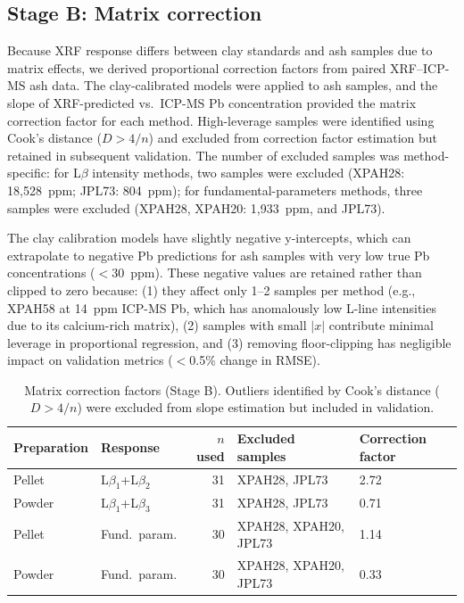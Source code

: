 \documentclass[journal=esthag,manuscript=suppinfo]{achemso}
\begin{document}
\subsection*{Stage B: Matrix correction}

Because XRF response differs between clay standards and ash samples due to matrix effects, we derived proportional correction factors from paired XRF--ICP-MS ash data. The clay-calibrated models were applied to ash samples, and the slope of XRF-predicted vs.\ ICP-MS Pb concentration provided the matrix correction factor for each method. High-leverage samples were identified using Cook's distance ($D > 4/n$) and excluded from correction factor estimation but retained in subsequent validation. The number of excluded samples was method-specific: for L$\beta$ intensity methods, two samples were excluded (XPAH28: 18,528~ppm; JPL73: 804~ppm); for fundamental-parameters methods, three samples were excluded (XPAH28, XPAH20: 1,933~ppm, and JPL73).

The clay calibration models have slightly negative y-intercepts, which can extrapolate to negative Pb predictions for ash samples with very low true Pb concentrations ($<$30~ppm). These negative values are retained rather than clipped to zero because: (1) they affect only 1--2 samples per method (e.g., XPAH58 at 14~ppm ICP-MS Pb, which has anomalously low L-line intensities due to its calcium-rich matrix), (2) samples with small $|x|$ contribute minimal leverage in proportional regression, and (3) removing floor-clipping has negligible impact on validation metrics ($<$0.5\% change in RMSE).

\begin{table}[htbp]
\caption{Matrix correction factors (Stage B). Outliers identified by Cook's distance ($D > 4/n$) were excluded from slope estimation but included in validation.}
\label{tab:matrix_correction}
\centering
\small
\begin{tabular}{llrll}
\toprule
Preparation & Response & $n$ used & Excluded samples & Correction factor \\
\midrule
Pellet  & L$\beta_1$+L$\beta_2$ & 31 & XPAH28, JPL73 & 2.72 \\
Powder  & L$\beta_1$+L$\beta_3$ & 31 & XPAH28, JPL73 & 0.71 \\
Pellet  & Fund.\ param.         & 30 & XPAH28, XPAH20, JPL73 & 1.14 \\
Powder  & Fund.\ param.         & 30 & XPAH28, XPAH20, JPL73 & 0.33 \\
\bottomrule
\end{tabular}
\end{table}
\end{document}
